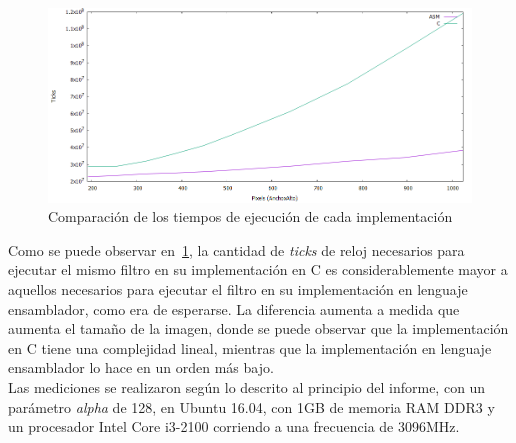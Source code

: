 \documentclass[a4paper]{article}
\begin{document}
\\
\begin{figure}[H]
  \begin{center}
	\includegraphics[scale=0.66]{imagenes/combinarC.png}
	\caption{Comparación de los tiempos de ejecución de cada implementación}
	\label{combinar_asmvsc}
  \end{center}
\end{figure}
Como se puede observar en~\ref{combinar_asmvsc}, la cantidad de \textit{ticks} de reloj necesarios para ejecutar el mismo filtro en su implementación en C es considerablemente mayor a aquellos necesarios para ejecutar el filtro en su implementación en lenguaje ensamblador, como era de esperarse. La diferencia aumenta a medida que aumenta el tamaño de la imagen, donde se puede observar que la implementación en C tiene una complejidad lineal, mientras que la implementación en lenguaje ensamblador lo hace en un orden más bajo.
\\Las mediciones se realizaron según lo descrito al principio del informe, con un parámetro \textit{alpha} de 128, en Ubuntu 16.04, con 1GB de memoria RAM DDR3 y un procesador Intel Core i3-2100 corriendo a una frecuencia de 3096MHz.
\end{document}
